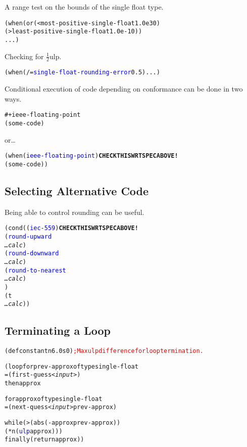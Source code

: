 \documentclass[10pt,fleqn]{article}
\newcommand{\codelia}[1]{\textcolor{blue}{#1}}
\begin{document}
\noindent
A range test on the bounds of the single float type.
\begin{alltt}
    (when (or (< most-positive-single-float 1.0e30)
              (> least-positive-single-float 1.0e-10))
        ...)
\end{alltt}

\noindent
Checking for $\frac{1}{2}$ulp.
\begin{alltt}
    (when (/= \codelia{single-float-rounding-error} 0.5) ...)
\end{alltt}

\noindent
Conditional execution of code depending on conformance can be done in
two ways.
\begin{alltt}
    #+ieee-floating-point 
    (some-code) 
\end{alltt}
or\ldots
\begin{alltt}
    (when (\codelia{ieee-floating-point}) \textbf{CHECK THIS WRT SPEC ABOVE!}
        (some-code))
\end{alltt}


\subsection{Selecting Alternative Code}

Being able to control rounding can be useful.
\begin{alltt}
    (cond ((\codelia{iec-559}) \textbf{CHECK THIS WRT SPEC ABOVE!}
           (\codelia{round-upward} 
              \textit{\ldots calc})
           (\codelia{round-downward}
              \textit{\ldots calc})
           (\codelia{round-to-nearest}
              \textit{\ldots calc})
           )
          (t
           \textit{\ldots calc}))
\end{alltt}

\subsection{Terminating a Loop}

\begin{alltt}
    (defconstant n 6.0s0) \textcolor{red}{; Max ulp difference for loop termination.}

    (loop for prev-approx of type single-float
          = (first-guess <\textit{input}>)
          then approx

          for approx of type single-float
          = (next-quess <\textit{input}> prev-approx)

          while (> (abs (- approx prev-approx))
                   (* n (\codelia{ulp} approx)))
          finally (return approx))
\end{alltt}
\end{document}
